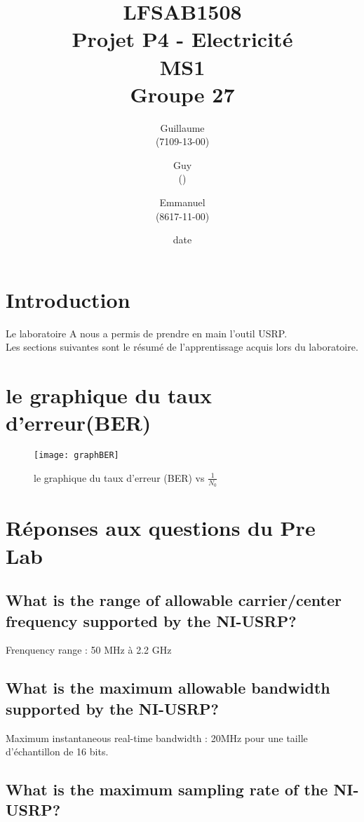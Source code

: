 \documentclass[11pt]{article}
\title{\textbf{LFSAB1508\\ Projet P4 - Electricité \\ MS1} \\ {\large Groupe 27}}
\author{Guillaume \bsc{Lamine} \\(7109-13-00) \and Guy \bsc{Mavungu Zola Lutete} \\()  \and Emmanuel \bsc{Dushimimana} \\ (8617-11-00)}
\date{date}
\date{\vspace*{25mm}
\texttt{[image: logo.jpg]}\\
		\vspace*{30mm} 
		\begin{center}
		Année académique 2015-2016 \\	
		\end{center}}
\begin{document}
\thispagestyle{empty}

\maketitle
\thispagestyle{empty}
\setcounter{tocdepth}{3}
\setcounter{page}{1}
\newpage


\section*{Introduction}
Le laboratoire A nous a permis de prendre en main l'outil USRP. \\ Les sections suivantes sont le résumé de l'apprentissage acquis lors du laboratoire.

\section{le graphique du taux d'erreur(BER)}

 \begin{figure}[!h]
     \centering
     \texttt{[image: graphBER]}
     \caption{le graphique du taux d'erreur (BER) vs $\frac{1}{N_0}$}
     \label{ber}
 \end{figure}
 
\section{Réponses aux questions du Pre Lab}
 
\subsection{What is the range of allowable carrier/center frequency supported by
the NI-USRP?}

Frenquency range : 50 MHz à 2.2 GHz

\subsection{What is the maximum allowable bandwidth supported by the NI-USRP?}

Maximum instantaneous real-time bandwidth : 20MHz pour une taille d'échantillon de 16 bits.

\subsection{What is the maximum sampling rate of the NI-USRP?}
\end{document}
